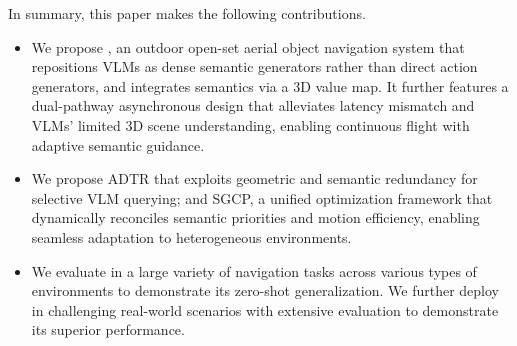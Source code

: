 In summary, this paper makes the following contributions.
\begin{itemize}
    \item We propose \sysname, an outdoor open-set aerial object navigation system that repositions VLMs as dense semantic generators rather than direct action generators, and integrates semantics via a 3D value map. It further features a dual-pathway asynchronous design that alleviates latency mismatch and VLMs’ limited 3D scene understanding, enabling continuous flight with adaptive semantic guidance.
    \item We propose ADTR that exploits geometric and semantic redundancy for selective VLM querying; and SGCP, a unified optimization framework that dynamically reconciles semantic priorities and motion efficiency, enabling seamless adaptation to heterogeneous environments.
    \item We evaluate \sysname in a large variety of navigation tasks across various types of environments to demonstrate its zero-shot generalization. We further deploy \sysname in challenging real-world scenarios with extensive evaluation to demonstrate its superior performance. 
\end{itemize}



